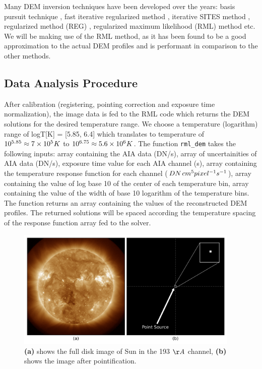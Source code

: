 Many DEM inversion techniques have been developed over the years: basis pursuit technique \citep{Cheung2015}, fast iterative regularized method \citep{Plowman2013}, iterative SITES method \citep{Morgan2019}, regularized method (REG) \citep{Hannah2012}, regularized maximum likelihood (RML) method \citep{Massa2023} etc. We will be making use of the RML method, as it has been found to be a good approximation to the actual DEM profiles and is performant in comparison to the other methods.

\subsection{Data Analysis Procedure}
\label{sec:data_analysis_procedure}

After calibration (registering, pointing correction and exposure time normalization), the image data is fed to the RML code {\citep{Massa2023}} which returns the DEM solutions for the desired temperature range. We choose a temperature (logarithm) range of logT[K] = [5.85, 6.4] which translates to temperature of $10^{5.85} \approx 7 \times 10^5 \hspace{0.1mm} K$ to $10^{6.75} \approx 5.6 \times 10^6 \hspace{0.1mm} K$. The function \texttt{rml\_dem} takes the following inputs: array containing the AIA data (DN/s), array of uncertainities of AIA data (DN/s), exposure time value for each AIA channel (s), array containing the temperature response function for each channel ($ DN \hspace{0.5mm} cm^5 pixel^{-1} s^{-1}$), array containing the value of log base 10 of the center of each temperature bin, array containing the value of the width of base 10 logarithm of the temperature bins. The function returns an array containing the values of the reconstructed DEM profiles. The returned solutions will be spaced according the temperature spacing of the response function array fed to the solver.\\

\begin{figure}[h!]
    \centering
    \includegraphics[width=0.95\textwidth]{images/ps_plus_full_disk.png}
    \caption[Full Disk and Pointified Image of Sun]{\textbf{(a)} shows the full disk image of Sun in the 193 $\AA$ channel, \textbf{(b)} shows the image after pointification.}
    \label{fig:ps_plus_full_disk}
\end{figure}

